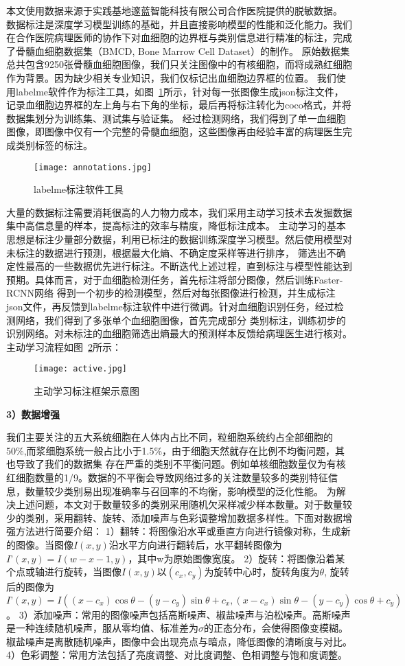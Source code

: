 本文使用数据来源于实践基地邃蓝智能科技有限公司合作医院提供的脱敏数据。
数据标注是深度学习模型训练的基础，并且直接影响模型的性能和泛化能力。我们在合作医院病理医师的协作下对血细胞的边界框与类别信息进行精准的标注，完成了骨髓血细胞数据集（BMCD, Bone Marrow Cell Dataset）的制作。
原始数据集总共包含9250张骨髓血细胞图像，我们只关注图像中的有核细胞，而将成熟红细胞作为背景。因为缺少相关专业知识，我们仅标记出血细胞边界框的位置。
我们使用labelme软件作为标注工具，如图~\ref{fig:annotations}所示，针对每一张图像生成json标注文件，记录血细胞边界框的左上角与右下角的坐标，最后再将标注转化为coco格式，并将数据集划分为训练集、测试集与验证集。
经过检测网络，我们得到了单一血细胞图像，即图像中仅有一个完整的骨髓血细胞，这些图像再由经验丰富的病理医生完成类别标签的标注。


\begin{figure}
  \centering
  \texttt{[image: annotations.jpg]}
  \caption{labelme标注软件工具}
  \label{fig:annotations}
\end{figure}

大量的数据标注需要消耗很高的人力物力成本，我们采用主动学习技术去发掘数据集中高信息量的样本，提高标注的效率与精度，降低标注成本。
主动学习的基本思想是标注少量部分数据，利用已标注的数据训练深度学习模型。然后使用模型对未标注的数据进行预测，根据最大化熵、不确定度采样等进行排序，
筛选出不确定性最高的一些数据优先进行标注。不断迭代上述过程，直到标注与模型性能达到预期。具体而言，对于血细胞检测任务，首先标注将部分图像，然后训练Faster-RCNN网络
得到一个初步的检测模型，然后对每张图像进行检测，并生成标注json文件，再反馈到labelme标注软件中进行微调。针对血细胞识别任务，经过检测网络，我们得到了多张单个血细胞图像，首先完成部分
类别标注，训练初步的识别网络。对未标注的血细胞筛选出熵最大的预测样本反馈给病理医生进行核对。主动学习流程如图~\ref{fig:active}所示：

\begin{figure}
  \centering
  \texttt{[image: active.jpg]}
  \caption{主动学习标注框架示意图}
  \label{fig:active}
\end{figure}
\textbf{3）数据增强}

我们主要关注的五大系统细胞在人体内占比不同，粒细胞系统约占全部细胞的50\%,而浆细胞系统一般占比小于1.5\%，由于细胞天然就存在比例不均衡问题，其也导致了我们的数据集
存在严重的类别不平衡问题。例如单核细胞数量仅为有核红细胞数量的1/9。数据的不平衡会导致网络过多的关注数量较多的类别特征信息，数量较少类别易出现准确率与召回率的不均衡，影响模型的泛化性能。
为解决上述问题，本文对于数量较多的类别采用随机欠采样减少样本数量。对于数量较少的类别，采用翻转、旋转、添加噪声与色彩调整增加数据多样性。下面对数据增强方法进行简要介绍：
1）翻转：将图像沿水平或垂直方向进行镜像对称，生成新的图像。当图像$I(x,y)$沿水平方向进行翻转后，水平翻转图像为$I’(x, y)=I(w-x-1,y)$，其中w为原始图像宽度。
2）旋转：将图像沿着某个点或轴进行旋转，当图像$I(x,y)$以$(c_x, c_y)$为旋转中心时，旋转角度为$\theta$, 旋转后的图像为$I’(x, y)=I((x - c_x)\cos\theta - (y - c_y)\sin\theta + c_x, (x - c_x)\sin\theta - (y - c_y)\cos\theta + c_y)$。
3）添加噪声：常用的图像噪声包括高斯噪声、椒盐噪声与泊松噪声。高斯噪声是一种连续随机噪声，服从零均值、标准差为$\sigma$的正态分布，会使得图像变模糊。
椒盐噪声是离散随机噪声，图像中会出现亮点与暗点，降低图像的清晰度与对比。
4）色彩调整：常用方法包括了亮度调整、对比度调整、色相调整与饱和度调整。

